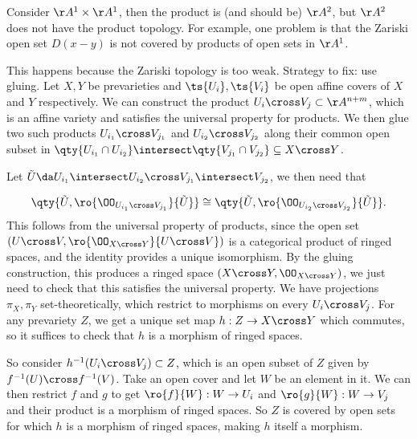 \begin{example}

Consider \(\AA^1 \times \AA^1\), then the product is (and should be)
\(\AA^2\), but \(\AA^2\) does not have the product topology. For
example, one problem is that the Zariski open set \(D(x-y)\) is not
covered by products of open sets in \(\AA^1\).

\end{example}

This happens because the Zariski topology is too weak. Strategy to fix:
use gluing. Let \(X, Y\) be prevarieties and \(\ts{U_i}, \ts{V_i}\) be
open affine covers of \(X\) and \(Y\) respectively. We can construct the
product \(U_i \cross V_j \subset \AA^{n+m}\), which is an affine variety
and satisfies the universal property for products. We then glue two such
products \(U_{i_1} \cross V_{j_1}\) and \(U_{i_2} \cross V_{j_2}\) along
their common open subset in
\(\qty{U_{i_1}\cap U_{i_2} }\intersect\qty{V_{j_1} \cap V_{j_2}} \subseteq X\cross Y\).

Let
\(\tilde U \da U_{i_1} \intersect U_{i_2} \cross V_{j_1} \intersect V_{j_2}\),
we then need that

\begin{align*}  
\qty{ \tilde U, \ro{ \OO_{U_{i_1} \cross V_{j_1}} }{\tilde U} } \cong
\qty{ \tilde U, \ro{ \OO_{U_{i_2} \cross V_{j_2}} }{\tilde U} }
.\end{align*} This follows from the universal property of products,
since the open set \((U\cross V, \ro{ \OO_{X\cross Y} }{U\cross V} )\)
is a categorical product of ringed spaces, and the identity provides a
unique isomorphism. By the gluing construction, this produces a ringed
space \((X\cross Y, \OO_{X\cross Y})\), we just need to check that this
satisfies the universal property. We have projections \(\pi_X, \pi_Y\)
set-theoretically, which restrict to morphisms on every
\(U_i \cross V_j\). For any prevariety \(Z\), we get a unique set map
\(h:Z\to X\cross Y\) which commutes, so it suffices to check that \(h\)
is a morphism of ringed spaces.

So consider \(h^{-1} (U_i \cross V_j) \subset Z\), which is an open
subset of \(Z\) given by \(f^{-1}(U) \cross f^{-1}(V)\). Take an open
cover and let \(W\) be an element in it. We can then restrict \(f\) and
\(g\) to get \(\ro{f}{W}:W\to U_i\) and \(\ro{g}{W}:W\to V_j\) and their
product is a morphism of ringed spaces. So \(Z\) is covered by open sets
for which \(h\) is a morphism of ringed spaces, making \(h\) itself a
morphism.

